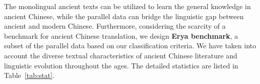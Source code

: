 The monolingual ancient texts can be utilized to learn the general knowledge in ancient Chinese, while the parallel data can bridge the linguistic gap between ancient and modern Chinese. Furthermore, considering the scarcity of a benchmark for ancient Chinese translation, we design \textbf{Erya benchmark}, a subset of the parallel data based on our classification criteria. We have taken into account the diverse textual characteristics of ancient Chinese literature and linguistic evolution throughout the ages. The detailed statistics are listed in Table~\ref{tab:stat}.





